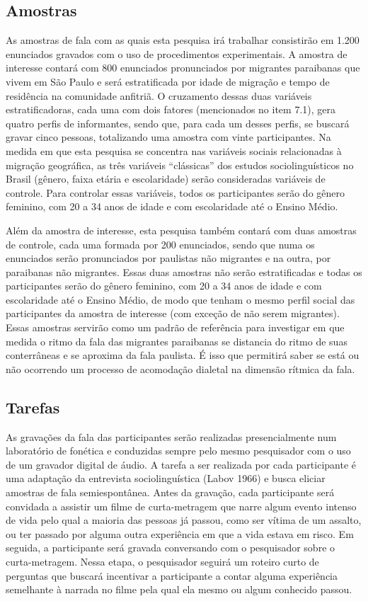 \documentclass[
			a4paper,		%
			12pt,			%
			oneside,
			]{article}		%
\begin{document}
	\subsection{Amostras}
		
As amostras de fala com as quais esta pesquisa irá trabalhar consistirão em 1.200 
enunciados gravados com o uso de procedimentos experimentais. A amostra de interesse 
contará com 800 enunciados pronunciados por migrantes paraibanas que vivem em São Paulo e 
será estratificada por idade de migração e tempo de residência na comunidade anfitriã. O 
cruzamento dessas duas variáveis estratificadoras, cada uma com dois fatores (mencionados 
no item 7.1), gera quatro perfis de informantes, sendo que, para cada um desses perfis, 
se buscará gravar cinco pessoas, totalizando uma amostra com vinte participantes. Na 
medida em que esta pesquisa se concentra nas variáveis sociais relacionadas à migração 
geográfica, as três variáveis “clássicas” dos estudos sociolinguísticos no Brasil 
(gênero, faixa etária e escolaridade) serão consideradas variáveis de controle. Para 
controlar essas variáveis, todos os participantes serão do gênero feminino, com 20 a 34 
anos de idade e com escolaridade até o Ensino Médio.
	
Além da amostra de interesse, esta pesquisa também contará com duas amostras de controle, 
cada uma formada por 200 enunciados, sendo que numa os enunciados serão pronunciados por 
paulistas não migrantes e na outra, por paraibanas não migrantes. Essas duas amostras não 
serão estratificadas e todas os participantes serão do gênero feminino, com 20 a 34 anos 
de idade e com escolaridade até o Ensino Médio, de modo que tenham o mesmo perfil social 
das participantes da amostra de interesse (com exceção de não serem migrantes). Essas 
amostras servirão como um padrão de referência para investigar em que medida o ritmo da 
fala das migrantes paraibanas se distancia do ritmo de suas conterrâneas e se aproxima da 
fala paulista. É isso que permitirá saber se está ou não ocorrendo um processo de 
acomodação dialetal na dimensão rítmica da fala. 

	\subsection{Tarefas}
	
As gravações da fala das participantes serão realizadas presencialmente num laboratório 
de fonética e conduzidas sempre pelo mesmo pesquisador com o uso de um gravador digital 
de áudio. A tarefa a ser realizada por cada participante é uma adaptação da entrevista 
sociolinguística (Labov 1966) e busca eliciar amostras de fala semiespontânea. Antes da 
gravação, cada participante será convidada a assistir um filme de curta-metragem que 
narre algum evento intenso de vida pelo qual a maioria das pessoas já passou, como ser 
vítima de um assalto, ou ter passado por alguma outra experiência em que a vida estava em 
risco. Em seguida, a participante será gravada conversando com o pesquisador sobre o 
curta-metragem. Nessa etapa, o pesquisador seguirá um roteiro curto de perguntas que 
buscará incentivar a participante a contar alguma experiência semelhante à narrada no 
filme pela qual ela mesmo ou algum conhecido passou.
\end{document}
